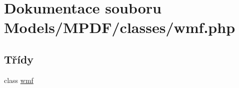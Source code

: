 \hypertarget{wmf_8php}{\section{Dokumentace souboru Models/\-M\-P\-D\-F/classes/wmf.php}
\label{wmf_8php}
}
\subsection*{Třídy}
\begin{DoxyCompactItemize}
\item 
class \hyperlink{classwmf}{wmf}
\end{DoxyCompactItemize}
